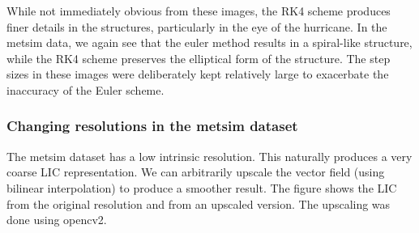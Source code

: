 \documentclass{article}
\begin{document}
While not immediately obvious from these images, the RK4 scheme produces finer details in the structures, particularly in the eye of the hurricane.
In the metsim data, we again see that the euler method results in a spiral-like structure, while the RK4 scheme preserves the elliptical form of the structure.
The step sizes in these images were deliberately kept relatively large to exacerbate the inaccuracy of the Euler scheme.



\newpage 
\subsubsection{Changing resolutions in the metsim dataset}
The metsim dataset has a low intrinsic resolution. This naturally produces a very coarse LIC representation. We can arbitrarily upscale
the vector field (using bilinear interpolation) to produce a smoother result. The figure shows the LIC from the original resolution and from an upscaled version.
The upscaling was done using opencv2.
\end{document}
